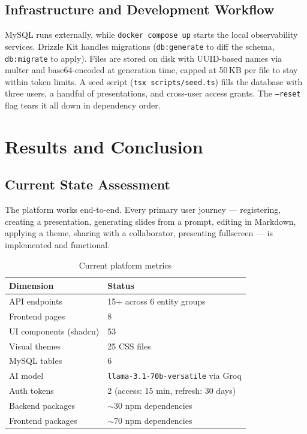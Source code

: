 \documentclass[10pt,a4paper]{article}
\begin{document}
\subsection{Infrastructure and Development Workflow}

MySQL runs externally, while \texttt{docker compose up} starts the local observability services. Drizzle Kit handles migrations (\texttt{db:generate} to diff the schema, \texttt{db:migrate} to apply). Files are stored on disk with UUID-based names via multer and base64-encoded at generation time, capped at 50\,KB per file to stay within token limits. A seed script (\texttt{tsx scripts/seed.ts}) fills the database with three users, a handful of presentations, and cross-user access grants. The \texttt{--reset} flag tears it all down in dependency order.

\section{Results and Conclusion}

\subsection{Current State Assessment}

The platform works end-to-end. Every primary user journey --- registering, creating a presentation, generating slides from a prompt, editing in Markdown, applying a theme, sharing with a collaborator, presenting fullscreen --- is implemented and functional.

\begin{table}[h!]
\centering\small
\renewcommand{\arraystretch}{1.2}
\begin{tabularx}{\linewidth}{@{} l X @{}}
\toprule
\textbf{Dimension} & \textbf{Status} \\
\midrule
API endpoints          & 15+ across 6 entity groups \\
Frontend pages         & 8 \\
UI components (shadcn) & 53 \\
Visual themes          & 25 CSS files \\
MySQL tables           & 6 \\
AI model               & \texttt{llama-3.1-70b-versatile} via Groq \\
Auth tokens            & 2 (access: 15 min, refresh: 30 days) \\
Backend packages       & $\sim$30 npm dependencies \\
Frontend packages      & $\sim$70 npm dependencies \\
\bottomrule
\end{tabularx}
\vspace{-0.5em}\caption{Current platform metrics}
\end{table}
\end{document}
